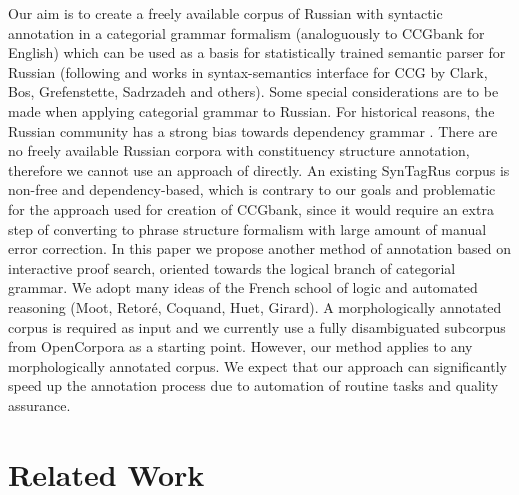 \documentclass[a4paper]{article}
\theoremstyle{example-style}
\begin{document}
Our aim is to create a freely available corpus of Russian with syntactic annotation in a categorial grammar formalism (analoguously to CCGbank for English) which can be used as a basis for statistically trained semantic parser for Russian (following \parencite{clark2007wide} and works in syntax-semantics interface for CCG  by Clark, Bos, Grefenstette, Sadrzadeh and others). Some special considerations are to be made when applying categorial grammar to Russian. For historical reasons, the Russian community has a strong bias towards dependency grammar \parencite{toldova2012nlp}. There are no freely available Russian corpora with constituency structure annotation, therefore we cannot use an approach of \parencite{hockenmaier2007ccgbank} directly. An existing SynTagRus corpus \parencite{boguslavsky2002development} is non-free and dependency-based, which is contrary to our goals and problematic for the  approach used for creation of CCGbank, since it would require an extra step of converting to phrase structure formalism with large amount of manual error correction. In this paper we propose another method of annotation based on interactive proof search, oriented towards the logical branch of categorial grammar. We adopt many ideas of the French school of logic and automated reasoning (Moot, Retor\'{e}, Coquand, Huet, Girard). A morphologically annotated corpus is required as input and we currently use a fully disambiguated subcorpus from OpenCorpora \parencite{granovsky2010opencorpora} as a starting point. However, our method applies to any morphologically annotated corpus. We expect that our approach can significantly speed up the annotation process due to automation of routine tasks and quality assurance.
     

\section{Related Work}
\end{document}
